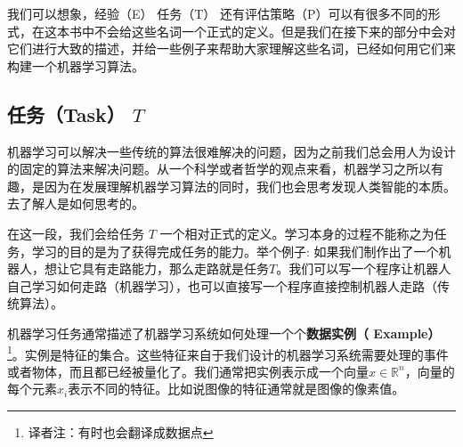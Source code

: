 我们可以想象，经验（E） 任务（T） 还有评估策略（P）可以有很多不同的形式，在这本书中不会给这些名词一个正式的定义。但是我们在接下来的部分中会对它们进行大致的描述，并给一些例子来帮助大家理解这些名词，已经如何用它们来构建一个机器学习算法。

\subsection{任务（Task） $T$}
\label{sec:5.1.1}
机器学习可以解决一些传统的算法很难解决的问题，因为之前我们总会用人为设计的固定的算法来解决问题。从一个科学或者哲学的观点来看，机器学习之所以有趣，是因为在发展理解机器学习算法的同时，我们也会思考发现人类智能的本质。去了解人是如何思考的。

在这一段，我们会给任务 $T$ 一个相对正式的定义。学习本身的过程不能称之为任务，学习的目的是为了获得完成任务的能力。举个例子: 如果我们制作出了一个机器人，想让它具有走路能力，那么走路就是任务$T$。我们可以写一个程序让机器人自己学习如何走路（机器学习），也可以直接写一个程序直接控制机器人走路（传统算法）。

机器学习任务通常描述了机器学习系统如何处理一个个\textbf{数据实例（ Example）}\footnote{译者注：有时也会翻译成数据点}。实例是特征的集合。这些特征来自于我们设计的机器学习系统需要处理的事件或者物体，而且都已经被量化了。我们通常把实例表示成一个向量$x\in \mathbb{R}^{n}$，向量的每个元素$x_i$表示不同的特征。比如说图像的特征通常就是图像的像素值。

